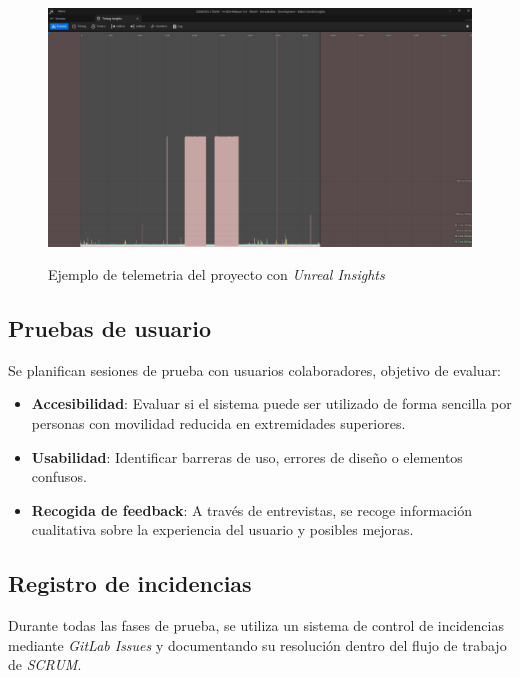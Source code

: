 \begin{figure}[h]
	\caption[Ejemplo de telemetria]{Ejemplo de telemetria del proyecto con \textit{Unreal Insights}}
	\centering
	\includegraphics[width=\textwidth]{../img/anexos/ejemplo_telemetria_unreal.png}
	\label{b:telemetria_unreal}
\end{figure}

\subsection{Pruebas de usuario}

Se planifican sesiones de prueba con usuarios colaboradores, objetivo de evaluar:

\begin{itemize}
    \item \textbf{Accesibilidad}: Evaluar si el sistema puede ser utilizado de forma sencilla por personas con movilidad reducida en extremidades superiores.
    
    \item \textbf{Usabilidad}: Identificar barreras de uso, errores de diseño o elementos confusos.
    
    \item \textbf{Recogida de feedback}: A través de entrevistas, se recoge información cualitativa sobre la experiencia del usuario y posibles mejoras.
    
\end{itemize}

\subsection{Registro de incidencias}

Durante todas las fases de prueba, se utiliza un sistema de control de incidencias mediante \textit{GitLab Issues} y documentando su resolución dentro del flujo de trabajo de \textit{SCRUM}.

